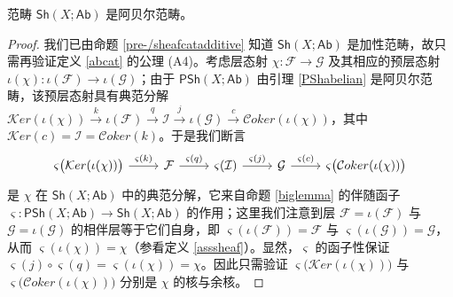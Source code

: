 \begin{Thm}\label{Sh(X,Ab)isabelian}
范畴 $\mathsf{Sh}(X;\mathsf{Ab})$ 是阿贝尔范畴。
\end{Thm}

\begin{proof}
我们已由命题 \ref{pre-/sheafcatadditive} 知道 $\mathsf{Sh}(X;\mathsf{Ab})$ 是加性范畴，故只需再验证定义 \ref{abcat} 的公理 (A4)。考虑层态射 $\chi:\mathcal{F}\rightarrow\mathcal{G}$ 及其相应的预层态射 $\iota(\chi):\iota(\mathcal{F})\rightarrow\iota(\mathcal{G})$；由于 $\mathsf{PSh}(X;\mathsf{Ab})$ 由引理 \ref{PShabelian} 是阿贝尔范畴，该预层态射具有典范分解 $\mathcal{K}er(\iota(\chi))\xrightarrow{k}\iota(\mathcal{F})\xrightarrow{q}\mathcal{I}\xrightarrow{j}\iota(\mathcal{G})\xrightarrow{c}\mathcal{C}oker(\iota(\chi))$，其中 $\mathcal{K}er(c)=\mathcal{I}=\mathcal{C}oker(k)$。于是我们断言
\begin{equation}\label{sheafcandecompo}
	\begin{tikzcd}
		\varsigma\big(\mathcal{K}er(\iota(\chi))\big)\arrow[r, "\varsigma(k)"] & \mathcal{F}\arrow[r, "\varsigma(q)"] & \varsigma(\mathcal{I})\arrow[r, "\varsigma(j)"] & \mathcal{G}\arrow[r, "\varsigma(c)"] & \varsigma\big(\mathcal{C}oker(\iota(\chi))\big)
	\end{tikzcd}
\end{equation}
是 $\chi$ 在 $\mathsf{Sh}(X;\mathsf{Ab})$ 中的典范分解，它来自命题 \ref{biglemma} 的伴随函子 $\varsigma:\mathsf{PSh}(X;\mathsf{Ab})\rightarrow\mathsf{Sh}(X;\mathsf{Ab})$ 的作用；这里我们注意到层 $\mathcal{F}=\iota(\mathcal{F})$ 与 $\mathcal{G}=\iota(\mathcal{G})$ 的相伴层等于它们自身，即 $\varsigma(\iota(\mathcal{F}))=\mathcal{F}$ 与 $\varsigma(\iota(\mathcal{G}))=\mathcal{G}$，从而 $\varsigma(\iota(\chi))=\chi$（参看定义 \ref{asssheaf}）。显然，$\varsigma$ 的函子性保证 $\varsigma(j)\circ\varsigma(q)=\varsigma(\iota(\chi))=\chi$。因此只需验证 $\varsigma\big(\mathcal{K}er(\iota(\chi))\big)$ 与 $\varsigma\big(\mathcal{C}oker(\iota(\chi))\big)$ 分别是 $\chi$ 的核与余核。


\end{proof}
